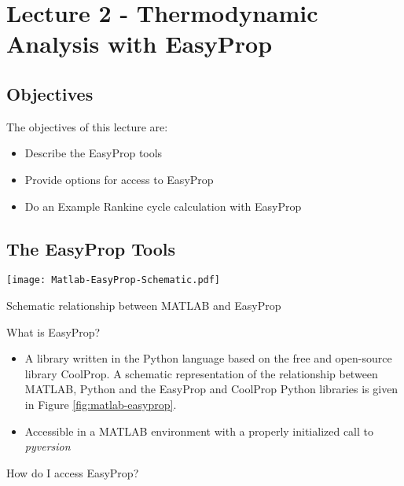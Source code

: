 \chapter{Lecture 2 - Thermodynamic Analysis with EasyProp}
\label{ch:ch2}
\section{Objectives}
The objectives of this lecture are:
\begin{itemize}
\item Describe the EasyProp tools
\item Provide options for access to EasyProp
\item Do an Example Rankine cycle calculation with EasyProp
\end{itemize}

\section{The EasyProp Tools}

\begin{marginfigure}
\texttt{[image: Matlab-EasyProp-Schematic.pdf]}
\caption{Schematic relationship between MATLAB and EasyProp}
\label{fig:matlab-easyprop}
\end{marginfigure}

What is EasyProp? 

\begin{itemize}
\item A library written in the Python language based on the free and open-source library CoolProp.  A schematic representation of the relationship between MATLAB, Python and the EasyProp and CoolProp Python libraries is given in Figure \ref{fig:matlab-easyprop}.
\item Accessible in a MATLAB environment with a properly initialized call to \emph{pyversion}
\end{itemize}
How do I access EasyProp?

